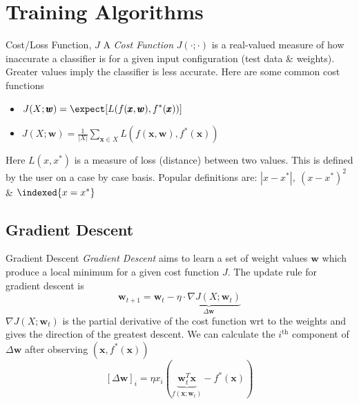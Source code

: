 \documentclass[11pt,a4paper]{article}
\begin{document}
\section{Training Algorithms}

\begin{definition}{Cost/Loss Function, $J$}
  A \textit{Cost Function} $J(\cdot;\cdot)$ is a real-valued measure of how inaccurate a classifier is for a given input configuration (test data \& weights). Greater values imply the classifier is less accurate. Here are some common cost functions
  \begin{itemize}
    \item[Expected Loss] $\displaystyle J(X;\pmb{w})=\expect[L(f(\pmb{x},\pmb{w}),f^*(\pmb{x}))]$
    \item[Empirical Risk] $\displaystyle J(X;\pmb{w})=\frac1{|X|}\sum_{\pmb{x}\in X}L(f(\pmb{x},\pmb{w}),f^*(\pmb{x}))$
  \end{itemize}
  Here $L(x,x^*)$ is a measure of loss (distance) between two values. This is defined by the user on a case by case basis. Popular definitions are: $|x-x^*|,\ (x-x^*)^2$ \& $\indexed\{x=x^*\}$
\end{definition}

\subsection{Gradient Descent}

\begin{definition}{Gradient Descent}
  \textit{Gradient Descent} aims to learn a set of weight values $\pmb{w}$ which produce a local minimum for a given cost function $J$. The update rule for gradient descent is
  \[ \pmb{w}_{t+1}=\pmb{w}_t-\underbrace{\eta\cdot\nabla J(X;\pmb{w}_t)}_{\Delta\pmb{w}} \]
  $\nabla J(X;\pmb{w}_t)$ is the partial derivative of the cost function wrt to the weights and gives the direction of the greatest descent. We can calculate the $i^\text{th}$ component of $\Delta\pmb{w}$ after observing $(\pmb{x},f^*(\pmb{x}))$
  \[ [\Delta\pmb{w}]_i=\eta x_i(\underbrace{\pmb{w}^T_t\pmb{x}}_{f(\pmb{x};\pmb{w}_t)}-f^*(\pmb{x})) \]
\end{definition}
\end{document}
